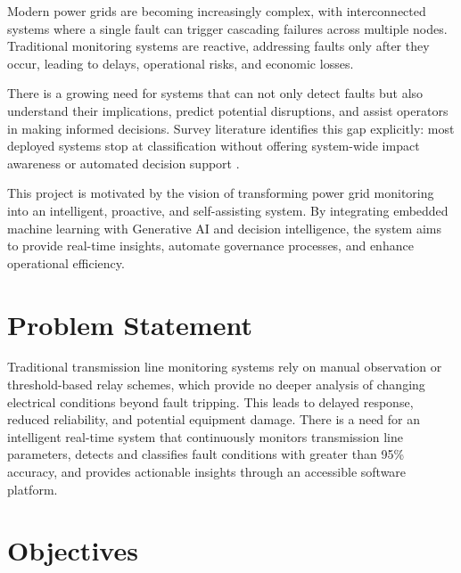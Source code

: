 Modern power grids are becoming increasingly complex, with interconnected systems where a single fault can trigger cascading failures across multiple nodes. Traditional monitoring systems are reactive, addressing faults only after they occur, leading to delays, operational risks, and economic losses.

There is a growing need for systems that can not only detect faults but also understand their implications, predict potential disruptions, and assist operators in making informed decisions. Survey literature identifies this gap explicitly: most deployed systems stop at classification without offering system-wide impact awareness or automated decision support \cite{Zhang2025,EnergyInformatics2025}.

This project is motivated by the vision of transforming power grid monitoring into an intelligent, proactive, and self-assisting system. By integrating embedded machine learning with Generative AI and decision intelligence, the system aims to provide real-time insights, automate governance processes, and enhance operational efficiency.

\section{\textbf{Problem Statement}}

Traditional transmission line monitoring systems rely on manual observation or threshold-based relay schemes, which provide no deeper analysis of changing electrical conditions beyond fault tripping. This leads to delayed response, reduced reliability, and potential equipment damage. There is a need for an intelligent real-time system that continuously monitors transmission line parameters, detects and classifies fault conditions with greater than 95\% accuracy, and provides actionable insights through an accessible software platform.

\section{\textbf{Objectives}}

